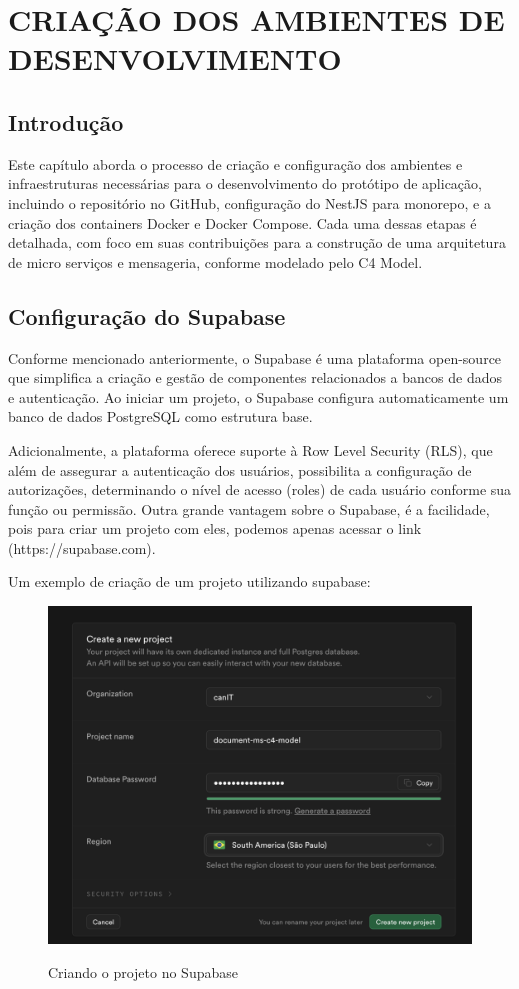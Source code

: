 \chapter{CRIAÇÃO DOS AMBIENTES DE DESENVOLVIMENTO}

\section{Introdução}

Este capítulo aborda o processo de criação e configuração dos ambientes e infraestruturas
necessárias para o desenvolvimento do protótipo de aplicação, incluindo o repositório no GitHub,
configuração do NestJS para monorepo, e a criação dos containers Docker e Docker Compose.
Cada uma dessas etapas é detalhada, com foco em suas contribuições para a construção de uma
arquitetura de micro serviços e mensageria, conforme modelado pelo C4 Model.

\section{Configuração do Supabase}

Conforme mencionado anteriormente, o Supabase é uma plataforma open-source que
simplifica a criação e gestão de componentes relacionados a bancos de dados e autenticação.
Ao iniciar um projeto, o Supabase configura automaticamente um banco de dados PostgreSQL
como estrutura base.

Adicionalmente, a plataforma oferece suporte à Row Level Security (RLS), que além de
assegurar a autenticação dos usuários, possibilita a configuração de autorizações, determinando
o nível de acesso (roles) de cada usuário conforme sua função ou permissão.
Outra grande vantagem sobre o Supabase, é a facilidade, pois para criar um projeto com
eles, podemos apenas acessar o link (https://supabase.com).

Um exemplo de criação de um projeto utilizando supabase:

\begin{figure}[!ht]
    \centering
    \caption{Criando o projeto no Supabase}
    \includegraphics[scale=0.44]{assets/create-new-project}
    \label{fig:create-new-project}
    \tiny
    \sourcemedaddy
\end{figure}

